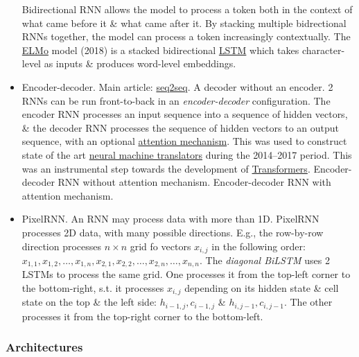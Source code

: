 \documentclass{article}
\begin{document}
\begin{itemize}
	Bidirectional RNN allows the model to process a token both in the context of what came before it \& what came after it. By stacking multiple bidrectional RNNs together, the model can process a token increasingly contextually. The \href{https://en.wikipedia.org/wiki/ELMo}{ELMo} model (2018) is a stacked bidirectional \href{https://en.wikipedia.org/wiki/Long_short-term_memory}{LSTM} which takes character-level as inputs \& produces word-level embeddings.
	\item {\sf Encoder-decoder.} Main article: \href{https://en.wikipedia.org/wiki/Seq2seq}{seq2seq}. {\sf A decoder without an encoder}. 2 RNNs can be run front-to-back in an {\it encoder-decoder} configuration. The encoder RNN processes an input sequence into a sequence of hidden vectors, \& the decoder RNN processes the sequence of hidden vectors to an output sequence, with an optional \href{https://en.wikipedia.org/wiki/Attention_(machine_learning)}{attention mechanism}. This was used to construct state of the art \href{https://en.wikipedia.org/wiki/Neural_machine_translation}{neural machine translators} during the 2014--2017 period. This was an instrumental step towards the development of \href{https://en.wikipedia.org/wiki/Transformer_(deep_learning_architecture)}{Transformers}. {\sf Encoder-decoder RNN without attention mechanism. Encoder-decoder RNN with attention mechanism.}
	\item {\sf PixelRNN.} An RNN may process data with more than 1D. PixelRNN processes 2D data, with many possible directions. E.g., the row-by-row direction processes $n\times n$ grid fo vectors $x_{i,j}$ in the following order: $x_{1,1},x_{1,2},\ldots,x_{1,n},x_{2,1},x_{2,2},\ldots,x_{2,n},\ldots,x_{n,n}$. The {\it diagonal BiLSTM} uses 2 LSTMs to process the same grid. One processes it from the top-left corner to the bottom-right, s.t. it processes $x_{i,j}$ depending on its hidden state \& cell state on the top \& the left side: $h_{i-1,j},c_{i-1,j}$ \& $h_{i,j-1},c_{i,j-1}$. The other processes it from the top-right corner to the bottom-left.
\end{itemize}

\subsubsection{Architectures}
\end{document}
